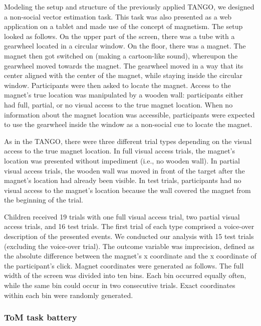 \documentclass[
  man,mask,floatsintext]{apa6}
\begin{document}
Modeling the setup and structure of the previously applied TANGO, we designed a non-social vector estimation task. This task was also presented as a web application on a tablet and made use of the concept of magnetism. The setup looked as follows. On the upper part of the screen, there was a tube with a gearwheel located in a circular window. On the floor, there was a magnet. The magnet then got switched on (making a cartoon-like sound), whereupon the gearwheel moved towards the magnet. The gearwheel moved in a way that its center aligned with the center of the magnet, while staying inside the circular window. Participants were then asked to locate the magnet. Access to the magnet's true location was manipulated by a wooden wall: participants either had full, partial, or no visual access to the true magnet location. When no information about the magnet location was accessible, participants were expected to use the gearwheel inside the window as a non-social cue to locate the magnet.

As in the TANGO, there were three different trial types depending on the visual access to the true magnet location. In full visual access trials, the magnet's location was presented without impediment (i.e., no wooden wall). In partial visual access trials, the wooden wall was moved in front of the target after the magnet's location had already been visible. In test trials, participants had no visual access to the magnet's location because the wall covered the magnet from the beginning of the trial.

Children received 19 trials with one full visual access trial, two partial visual access trials, and 16 test trials. The first trial of each type comprised a voice-over description of the presented events. We conducted our analysis with 15 test trials (excluding the voice-over trial). The outcome variable was imprecision, defined as the absolute difference between the magnet's x coordinate and the x coordinate of the participant's click. Magnet coordinates were generated as follows. The full width of the screen was divided into ten bins. Each bin occurred equally often, while the same bin could occur in two consecutive trials. Exact coordinates within each bin were randomly generated.

\hypertarget{tom-task-battery}{%
\subsubsection{ToM task battery}\label{tom-task-battery}}
\end{document}
